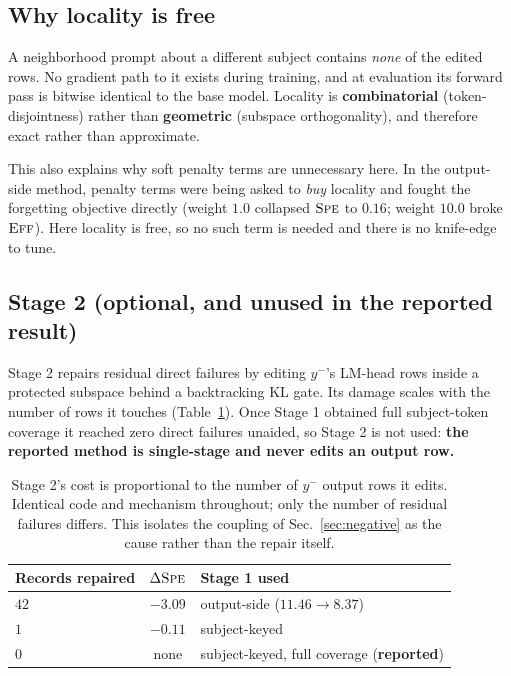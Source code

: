 \documentclass[11pt]{article}
\newcommand{\Eff}{\textsc{Eff}}
\newcommand{\Spe}{\textsc{Spe}}
\begin{document}
\subsection{Why locality is free}

A neighborhood prompt about a different subject contains \emph{none} of the
edited rows. No gradient path to it exists during training, and at evaluation
its forward pass is bitwise identical to the base model. Locality is
\textbf{combinatorial} (token-disjointness) rather than \textbf{geometric}
(subspace orthogonality), and therefore exact rather than approximate.

This also explains why soft penalty terms are unnecessary here. In the
output-side method, penalty terms were being asked to \emph{buy} locality and
fought the forgetting objective directly (weight $1.0$ collapsed $\Spe$ to
$0.16$; weight $10.0$ broke $\Eff$). Here locality is free, so no such term is
needed and there is no knife-edge to tune.

\subsection{Stage 2 (optional, and unused in the reported result)}

Stage 2 repairs residual direct failures by editing $y^{-}$'s LM-head rows
inside a protected subspace behind a backtracking KL gate. Its damage scales
with the number of rows it touches (Table~\ref{tab:stage2}). Once Stage 1
obtained full subject-token coverage it reached zero direct failures unaided,
so Stage 2 is not used: \textbf{the reported method is single-stage and never
edits an output row.}

\begin{table}[h]
\centering
\caption{Stage 2's cost is proportional to the number of $y^{-}$ output rows it
edits. Identical code and mechanism throughout; only the number of residual
failures differs. This isolates the coupling of Sec.~\ref{sec:negative} as the
cause rather than the repair itself.}
\label{tab:stage2}
\begin{tabular}{lcl}
\toprule
Records repaired & $\Delta\Spe$ & Stage 1 used \\
\midrule
$42$ & $-3.09$ & output-side ($11.46 \rightarrow 8.37$) \\
$1$  & $-0.11$ & subject-keyed \\
$0$  & none    & subject-keyed, full coverage (\textbf{reported}) \\
\bottomrule
\end{tabular}
\end{table}
\end{document}
